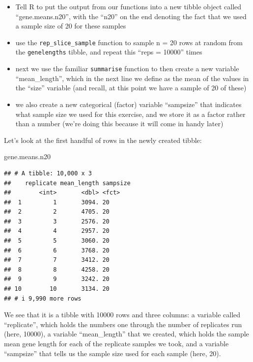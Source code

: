 \documentclass[
]{book}
\newenvironment{Shaded}{\begin{snugshade}}{\end{snugshade}}
\newcommand{\NormalTok}[1]{#1}
\providecommand{\tightlist}{%
  \setlength{\itemsep}{0pt}\setlength{\parskip}{0pt}}
\begin{document}
\begin{itemize}
\tightlist
\item
  Tell R to put the output from our functions into a new tibble object called ``gene.means.n20'', with the ``n20'' on the end denoting the fact that we used a sample size of 20 for these samples
\item
  use the \texttt{rep\_slice\_sample} function to sample n = 20 rows at random from the \texttt{genelengths} tibble, and repeat this ``reps = 10000'' times
\item
  next we use the familiar \texttt{summarise} function to then create a new variable ``mean\_length'', which in the next line we define as the mean of the values in the ``size'' variable (and recall, at this point we have a sample of 20 of these)
\item
  we also create a new categorical (factor) variable ``sampsize'' that indicates what sample size we used for this exercise, and we store it as a factor rather than a number (we're doing this because it will come in handy later)
\end{itemize}

Let's look at the first handful of rows in the newly created tibble:

\begin{Shaded}
\begin{Highlighting}[]
\NormalTok{gene.means.n20}
\end{Highlighting}
\end{Shaded}

\begin{verbatim}
## # A tibble: 10,000 x 3
##    replicate mean_length sampsize
##        <int>       <dbl> <fct>   
##  1         1       3094. 20      
##  2         2       4705. 20      
##  3         3       2576. 20      
##  4         4       2957. 20      
##  5         5       3060. 20      
##  6         6       3768. 20      
##  7         7       3412. 20      
##  8         8       4258. 20      
##  9         9       3242. 20      
## 10        10       3134. 20      
## # i 9,990 more rows
\end{verbatim}

We see that it is a tibble with 10000 rows and three columns: a variable called ``replicate'', which holds the numbers one through the number of replicates run (here, 10000), a variable ``mean\_length'' that we created, which holds the sample mean gene length for each of the replicate samples we took, and a variable ``sampsize'' that tells us the sample size used for each sample (here, 20).
\end{document}
